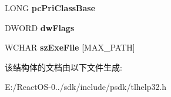 \begin{DoxyCompactItemize}
L\+O\+NG {\bfseries pc\+Pri\+Class\+Base}
\item 
\mbox{\label{structtag_p_r_o_c_e_s_s_e_n_t_r_y32_w_a70eb85133e875fbcec00d311589055a4}} 
D\+W\+O\+RD {\bfseries dw\+Flags}
\item 
\mbox{\label{structtag_p_r_o_c_e_s_s_e_n_t_r_y32_w_a87e87f51c9902cd57042e6df3ab09490}} 
W\+C\+H\+AR {\bfseries sz\+Exe\+File} \mbox{[}M\+A\+X\+\_\+\+P\+A\+TH\mbox{]}
\end{DoxyCompactItemize}


该结构体的文档由以下文件生成\+:\begin{DoxyCompactItemize}
\item 
E\+:/\+React\+O\+S-\/0../sdk/include/psdk/tlhelp32.\+h\end{DoxyCompactItemize}
